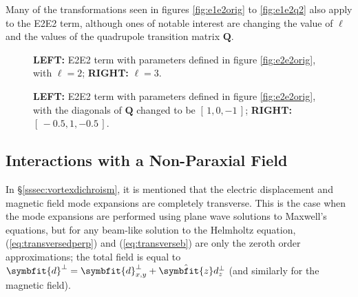 \documentclass{article}
\newcommand{\brackets}[1]{\left[\,#1\,\right]}
\begin{document}
\begin{onehalfspace}
	Many of the transformations seen in figures \ref{fig:e1e2orig} to \ref{fig:e1e2q2} also apply to the E2E2 term, although ones of notable interest are changing the value of \(\ell\) and the values of the quadrupole transition matrix \(\symbf{Q}\).

	\begin{figure}[H]
		\centering
		\begin{minipage}{0.5\textwidth}
			
		\end{minipage}\begin{minipage}{0.5\textwidth}
			
		\end{minipage}
		\caption{\textbf{L{\scriptsize EFT:}} E2E2 term with parameters defined in figure \ref{fig:e2e2orig}, with \(\ell=2\); \textbf{R{\scriptsize IGHT:}} \(\ell=3\).}
		\label{fig:e2e2l2}
	\end{figure}

	\begin{figure}[H]
		\centering
		\begin{minipage}{0.5\textwidth}
			
		\end{minipage}\begin{minipage}{0.5\textwidth}
			
		\end{minipage}
		\caption{\textbf{L{\scriptsize EFT:}} E2E2 term with parameters defined in figure \ref{fig:e2e2orig}, with the diagonals of \(\symbf{Q}\) changed to be \(\brackets{1,0,-1}\); \textbf{R{\scriptsize IGHT:}} \(\brackets{-0.5,1,-0.5}\).}
		\label{fig:e2e2q}
	\end{figure}

	\subsection{Interactions with a Non-Paraxial Field}\label{ssec:nonparax}

	In \S\ref{sssec:vortexdichroism}, it is mentioned that the electric displacement and magnetic field mode expansions are completely transverse. This is the case when the mode expansions are performed using plane wave solutions to Maxwell's equations, but for any beam-like solution
	to the Helmholtz equation, (\ref{eq:transversedperp}) and (\ref{eq:transverseb}) are only the zeroth order approximations; the total field is equal to \(\symbfit{d}^\perp = \symbfit{d}^\perp_{x,y} + \hat{\symbfit{z}}d^\perp_{z}\) (and similarly for the magnetic field).
	

\end{onehalfspace}
\end{document}
